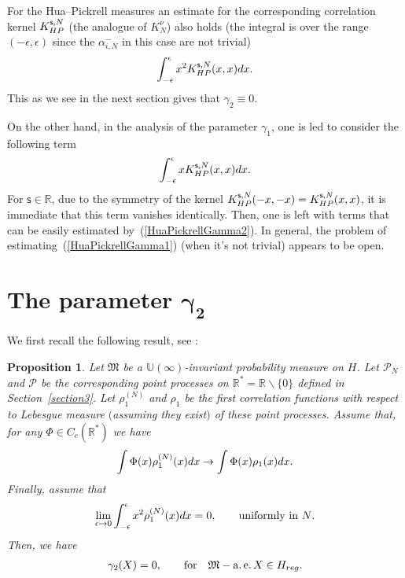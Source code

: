 \documentclass[11pt]{article}
\numberwithin{equation}{section}
\newtheorem{Proposition}[Theorem]{Proposition}
{ \theoremstyle{definition}
\newtheorem{Definition}[Theorem]{Definition}
\newtheorem{Remark}[Theorem]{Remark} }
\begin{document}
\begin{Remark}\label{EstimatesHuaPickrell}
For the Hua--Pickrell measures an estimate for the corresponding correlation kernel $K_{\rm HP}^{\mathsf{s},N}$ (the analogue of $K_{N}^{\nu}$) also holds (the integral is over the range $(-\epsilon,\epsilon)$ since the $\alpha_{i,N}^-$ in this case are not trivial)
\begin{gather}\label{HuaPickrellGamma2}
\int_{-\epsilon}^{\epsilon}x^2K_{\rm HP}^{\mathsf{s},N}(x,x){\rm d}x.
\end{gather}
This as we see in the next section gives that $\gamma_2 \equiv 0$.

On the other hand, in the analysis of the parameter $\gamma_1$, one is led to consider the following term
\begin{gather}\label{HuaPickrellGamma1}
\int_{-\epsilon}^{\epsilon}xK_{\rm HP}^{\mathsf{s},N}(x,x){\rm d}x.
\end{gather}
For $\mathsf{s} \in \mathbb{R}$, due to the symmetry of the kernel $K_{\rm HP}^{\mathsf{s},N}(-x,-x)=K_{\rm HP}^{\mathsf{s},N}(x,x)$, it is immediate that this term vanishes identically. Then, one is left with terms that can be easily estimated by~(\ref{HuaPickrellGamma2}). In general, the problem of estimating~(\ref{HuaPickrellGamma1}) (when it's not trivial) appears to be open.
\end{Remark}

\section[The parameter $\gamma_2$]{The parameter $\boldsymbol{\gamma_2}$}\label{section6}

We first recall the following result, see \cite[Proposition~7.2]{BorodinOlshanskiErgodic}:

\begin{Proposition}\label{BorodinOlshanskiGamm2}
Let $\mathfrak{M}$ be a $\mathbb{U}(\infty)$-invariant probability measure on $H$. Let $\mathcal{P}_N$ and $\mathcal{P}$ be the corresponding point processes on $\mathbb{R}^*=\mathbb{R}\backslash\{0\}$ defined in Section~{\rm \ref{section3}}. Let $\rho_1^{(N)}$ and $\rho_1$ be the first correlation functions with respect to Lebesgue measure $($assuming they exist$)$ of these point processes. Assume that, for any $\Phi\in C_c (\mathbb{R}^*)$ we have
\begin{gather}\label{ConvergenceCorrelationGamma2}
\int \Phi(x)\rho_1^{(N)}(x){\rm d}x\to \int \Phi(x)\rho_1(x){\rm d}x.
\end{gather}
Finally, assume that
\begin{gather}\label{UniformEstimateGamma2}
\lim_{\epsilon \to 0} \int_{-\epsilon}^{\epsilon}x^2 \rho_1^{(N)}(x){\rm d}x=0, \qquad \text{uniformly in $N$}.
\end{gather}
Then, we have
\begin{gather*}
\gamma_2(X)=0, \qquad \text{for} \quad \mathfrak{M}-\operatorname{a.e.} X \in H_{{\rm reg}}.
\end{gather*}
\end{Proposition}
\end{document}
